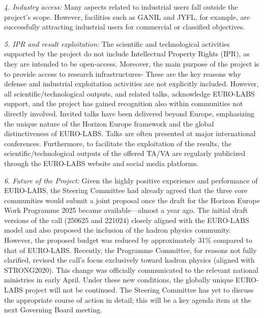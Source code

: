 {\it 4. Industry access:}
Many aspects related to industrial users fall outside the project's scope. However, facilities such as GANIL and JYFL, for example, are successfully attracting industrial users for commercial or classified objectives.



{\it 5. IPR and result exploitation:}
The scientific and technological activities supported by the project do not include Intellectual Property Rights (IPR), as they are intended to be open-access. Moreover, the main purpose of the project is to provide access to research infrastructures- These are the key reasons why defense and industrial exploitation activities are not explicitly included. However, all scientific/technological outputs, and related talks, acknowledge EURO-LABS support, and the project has gained recognition also within communities not directly involved. Invited talks have been delivered beyond Europe, emphasizing the unique nature of the Horizon Europe framework and the global distinctiveness of EURO-LABS. Talks are often presented at major international conferences. Furthermore, to facilitate the exploitation of the results, the scientific/technological outputs of the offered TA/VA are regularly publicized through the EURO-LABS website and social media platforms.


{\it 6. Future of the Project:}
Given the highly positive experience and performance of EURO-LABS, the Steering Committee had already agreed that the three core communities would submit a joint proposal once the draft for the Horizon Europe Work Programme 2025 became available—almost a year ago. The initial draft versions of the call (250625 and 221024) closely aligned with the EURO-LABS model and also proposed the inclusion of the hadron physics community. However, the proposed budget was reduced by approximately 31\% compared to that of EURO-LABS. Recently, the Programme Committee, for reasons not fully clarified, revised the call's focus exclusively toward hadron physics (aligned with STRONG2020). This change was officially communicated to the relevant national ministries in early April. Under these new conditions, the globally unique EURO-LABS project will not be continued. The Steering Committee has yet to discuss the appropriate course of action in detail; this will be a key agenda item at the next Governing Board meeting.


